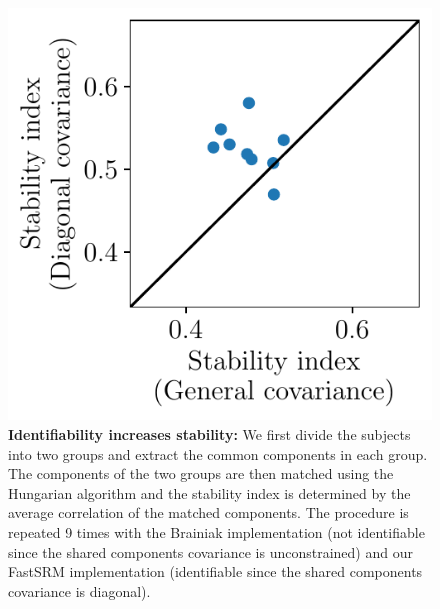 \documentclass{article}
\begin{document}
\begin{figure}
\begin{minipage}{0.38\linewidth}
      \includegraphics[width=\textwidth]{../figures/identifiability.pdf}
    \end{minipage}
    \hfill
    \begin{minipage}{0.6\linewidth}
        \caption{\label{exp:identifiability}\textbf{Identifiability increases
            stability: } We first divide the subjects
          into two groups and extract the common components in each group.
          The components of the two groups are then matched using the Hungarian
          algorithm and the stability index is determined by the average
          correlation of the matched components.
          The procedure is repeated 9 times with the Brainiak implementation
          (not identifiable since the shared components covariance is unconstrained) and our FastSRM implementation
          (identifiable since the shared components covariance is diagonal).
        }
    \end{minipage}
\end{figure}
\end{document}
